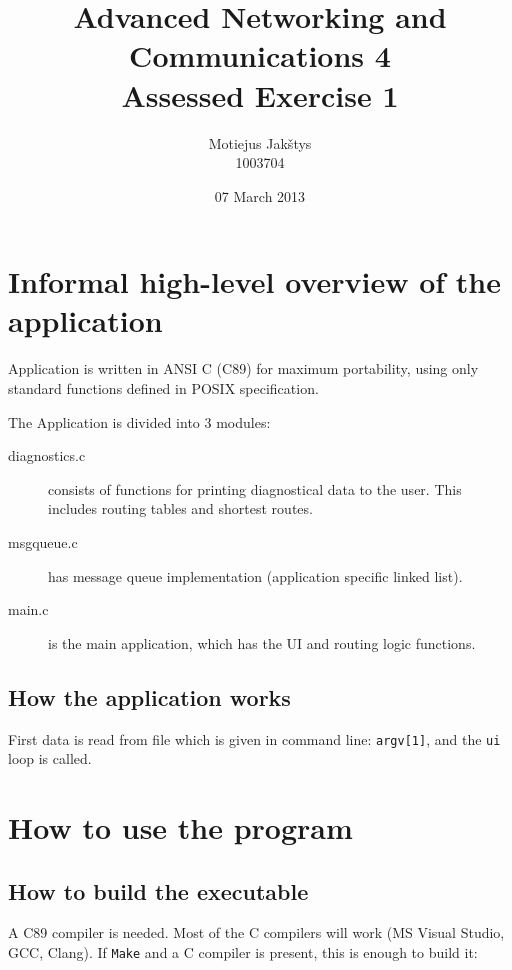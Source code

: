 \documentclass[english,11pt]{article}
\begin{document}
\title{Advanced Networking and Communications 4\\
    Assessed Exercise 1}
\author{Motiejus Jakštys\\ 1003704}
\date{07 March 2013}

\maketitle
\tableofcontents

\clearpage

\section{Informal high-level overview of the application}

Application is written in ANSI C (C89) for maximum portability, using only
standard functions defined in POSIX specification.

The Application is divided into 3 modules:

\begin{description}
    \item[diagnostics.c] consists of functions for printing diagnostical
        data to the user. This includes routing tables and shortest routes.
    \item[msgqueue.c] has message queue implementation (application specific
        linked list).
    \item[main.c] is the main application, which has the UI and routing
        logic functions.
\end{description}

\subsection{How the application works}

First data is read from file which is given in command line: \texttt{argv[1]},
and the \texttt{ui} loop is called.

\section{How to use the program}
\subsection{How to build the executable}

A C89 compiler is needed. Most of the C compilers will work (MS Visual Studio,
GCC, Clang). If \texttt{Make} and a C compiler is present, this is enough to
build it:
\end{document}
